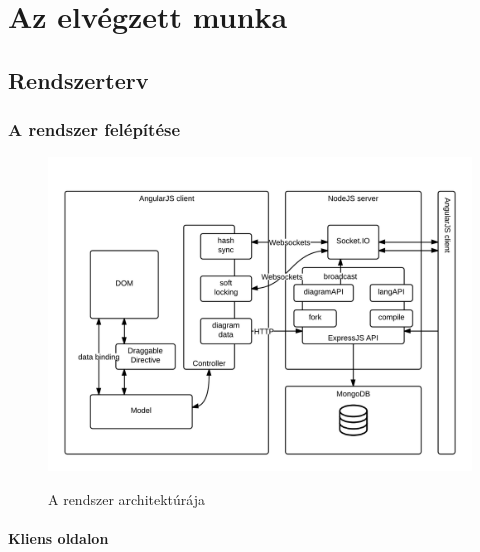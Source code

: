 \chapter{Az elvégzett munka}

\section{Rendszerterv}





\subsection{A rendszer felépítése}

\begin{figure}[!ht]
\centering
\includegraphics[width=\textwidth,height=\textheight,keepaspectratio]{figures/Rendszerterv.png}\\
\caption{A rendszer architektúrája}
\label{fig:arch}
\end{figure}

\subsubsection{Kliens oldalon}

